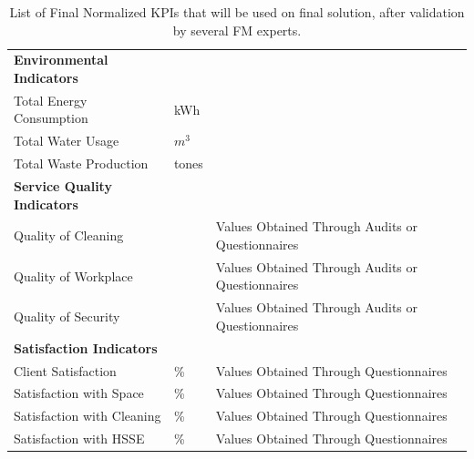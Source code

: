 \begin{table}[h!]
\begin{adjustwidth}{-0.5cm}{0cm}
{\begin{tabular}{llp{7cm}l}
		{\bf Environmental Indicators} & & \\
		Total Energy Consumption	 		& kWh & \\
		Total Water Usage					& $m^3$ & \\
		Total Waste Production 				& tones & \\
		\hline
		 {\bf Service Quality Indicators} &  &  \\ 
		Quality of Cleaning							&  & Values Obtained Through Audits or Questionnaires \\
		Quality of Workplace 						&  & Values Obtained Through Audits or Questionnaires \\
		Quality of Security 						&  & Values Obtained Through Audits or Questionnaires \\
		\hline
		{\bf Satisfaction Indicators} & & \\
		Client Satisfaction 			& \% & Values Obtained Through Questionnaires \\
		Satisfaction with Space			& \% & Values Obtained Through Questionnaires \\
		Satisfaction with Cleaning 		& \% & Values Obtained Through Questionnaires \\
		Satisfaction with HSSE			& \% & Values Obtained Through Questionnaires \\
		\hline
	\end{tabular}
	}
	\end{adjustwidth}
\caption{List of Final Normalized KPIs that will be used on final solution, after validation by several FM experts.}
\label{tb:ListFinalKPI}
\end{table}
			